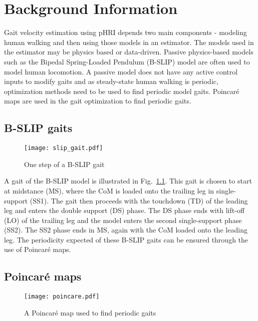 \chapter{Background Information}

Gait velocity estimation using pHRI depends two main components - modeling human walking and then using those models in an estimator. The models used in the estimator may be physics based or data-driven. Passive physics-based models such as the Bipedal Spring-Loaded Pendulum (B-SLIP) \cite{geyer2006compliant,liu2015dynamic} model are often used to model human locomotion. A passive model does not have any active control inputs to modify gaits and as steady-state human walking is periodic, optimization methods need to be used to find periodic model gaits. Poincar\'e maps are used in the gait optimization \cite{strogatz2018nonlinear,garcia1998simplest} to find periodic gaits.

\section{B-SLIP gaits}
\begin{figure}
	\centering
	\texttt{[image: slip\_gait.pdf]}
	\caption{One step of a B-SLIP gait}\label{fig:slip_gait}
\end{figure} 

A gait of the B-SLIP model is illustrated in Fig.~\ref{fig:slip_gait}. This gait is chosen to start at midstance (MS), where the CoM is loaded onto the trailing leg in single-support (SS1). The gait then proceeds with the touchdown (TD) of the leading leg and enters the double support (DS) phase. The DS phase ends with lift-off (LO) of the trailing leg and the model enters the second single-support phase (SS2). The SS2 phase ends in MS, again with the CoM loaded onto the leading leg. The periodicity expected of these B-SLIP gaits can be ensured through the use of Poincar\'e maps.

\section{Poincar\'e maps}
\begin{figure}
	\centering
	\texttt{[image: poincare.pdf]}
	\caption{A Poincar\'e map used to find periodic gaits}\label{fig:poincare}
\end{figure}

